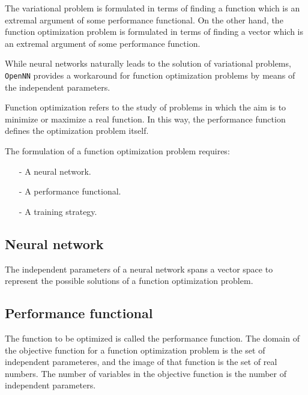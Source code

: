 
The variational problem is formulated in terms of finding a function
which is an extremal argument of some performance functional. On the
other hand, the function optimization problem is formulated in terms
of finding a vector which is an extremal argument of some performance
function.

While neural networks naturally leads to the solution of
variational problems, \texttt{OpenNN} provides a workaround for function
optimization problems by means of the independent parameters. 

Function optimization refers to the study of problems in which the
aim is to minimize or maximize a real function. In this way, the
performance function defines the optimization problem itself.

The formulation of a function optimization problem requires:

\begin{itemize}
\item[-] A neural network.
\item[-] A performance functional.
\item[-] A training strategy.
\end{itemize}

\subsection*{Neural network}

The independent parameters of a neural network spans a vector space to represent the possible solutions of a function optimization problem.

\subsection*{Performance functional}

The function to be optimized is called the performance function. The
domain of the objective function for a function optimization problem
is the set of independent parameteres, and the image of that function
is the set of real numbers. The number of variables in the objective function
is the number of independent parameters. 

